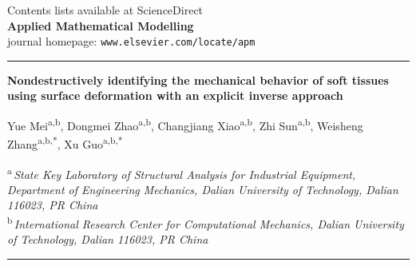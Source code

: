 \documentclass[11pt]{article}
\begin{document}

\noindent
{\footnotesize Contents lists available at ScienceDirect}\\[2pt]
{\Large\bfseries Applied Mathematical Modelling}\\[2pt]
{\footnotesize journal homepage: \texttt{www.elsevier.com/locate/apm}}

\vspace{0.8em}
\hrule
\vspace{1em}

{\large\bfseries
Nondestructively identifying the mechanical behavior of soft
tissues using surface deformation with an explicit inverse
approach\par}

\vspace{0.8em}

\noindent
Yue Mei\textsuperscript{a,b},
Dongmei Zhao\textsuperscript{a,b},
Changjiang Xiao\textsuperscript{a,b},
Zhi Sun\textsuperscript{a,b},
Weisheng Zhang\textsuperscript{a,b,*},
Xu Guo\textsuperscript{a,b,*}

\vspace{0.5em}

\noindent
{\footnotesize
\textsuperscript{a}\,\emph{State Key Laboratory of Structural Analysis
for Industrial Equipment, Department of Engineering Mechanics, Dalian
University of Technology, Dalian 116023, PR China}\\[2pt]
\textsuperscript{b}\,\emph{International Research Center for
Computational Mechanics, Dalian University of Technology, Dalian
116023, PR China}\par}

\vspace{1em}
\hrule
\vspace{1em}
\end{document}
